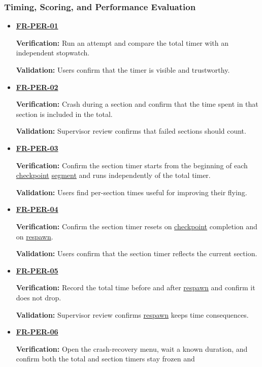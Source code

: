 \documentclass[12pt]{article}
\begin{document}
\subsubsection{Timing, Scoring, and Performance Evaluation}
\begin{itemize}
\item \hyperlink{req:FR-PER-01}{\textbf{FR-PER-01}}\par
 \textbf{Verification:} Run an attempt and compare the total timer with an
 independent stopwatch.\par
 \textbf{Validation:} Users confirm that the timer is visible and trustworthy.
\item \hyperlink{req:FR-PER-02}{\textbf{FR-PER-02}}\par
 \textbf{Verification:} Crash during a section and confirm that the time
 spent in that section is included in the total.\par
 \textbf{Validation:} Supervisor review confirms that failed sections should count.
\item \hyperlink{req:FR-PER-03}{\textbf{FR-PER-03}}\par
 \textbf{Verification:} Confirm the section timer starts from the beginning
 of each \hyperlink{glos:Checkpoint}{checkpoint} \hyperlink{glos:Checkpoint}{segment} and runs independently of the total timer.\par
 \textbf{Validation:} Users find per-section times useful for improving their flying.
\item \hyperlink{req:FR-PER-04}{\textbf{FR-PER-04}}\par
 \textbf{Verification:} Confirm the section timer resets on \hyperlink{glos:Checkpoint}{checkpoint}
 completion and on \hyperlink{glos:Respawn}{respawn}.\par
 \textbf{Validation:} Users confirm that the section timer reflects the current section.
\item \hyperlink{req:FR-PER-05}{\textbf{FR-PER-05}}\par
 \textbf{Verification:} Record the total time before and after \hyperlink{glos:Respawn}{respawn} and
 confirm it does not drop.\par
 \textbf{Validation:} Supervisor review confirms \hyperlink{glos:Respawn}{respawn} keeps time consequences.
\item \hyperlink{req:FR-PER-06}{\textbf{FR-PER-06}}\par
 \textbf{Verification:} Open the crash-recovery menu, wait a known
 duration, and confirm both the total and section timers stay frozen and

\end{itemize}
\end{document}
